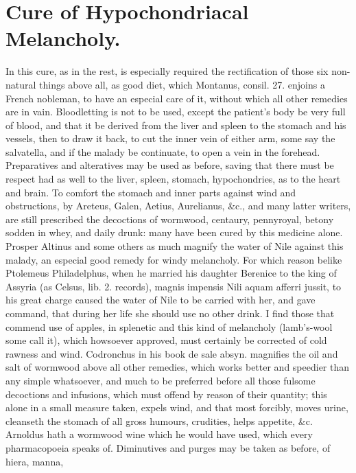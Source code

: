 \section{Cure of Hypochondriacal Melancholy.}

In this cure, as in the rest, is especially required the rectification
of those six non-natural things above all, as good diet, which
Montanus, consil. 27. enjoins a French nobleman, to have an especial
care of it, without which all other remedies are in vain. Bloodletting
is not to be used, except the patient's body be very full of blood, and
that it be derived from the liver and spleen to the stomach and his
vessels, then to draw it back, to cut the inner vein of either
arm, some say the salvatella, and if the malady be continuate, to
open a vein in the forehead.
Preparatives and alteratives may be used as before, saving that there
must be respect had as well to the liver, spleen, stomach,
hypochondries, as to the heart and brain. To comfort the stomach
and inner parts against wind and obstructions, by Areteus, Galen,
Aetius, Aurelianus, \&c., and many latter writers, are still prescribed
the decoctions of wormwood, centaury, pennyroyal, betony sodden in
whey, and daily drunk: many have been cured by this medicine alone.
Prosper Altinus and some others as much magnify the water of Nile
against this malady, an especial good remedy for windy melancholy. For
which reason belike Ptolemeus Philadelphus, when he married his
daughter Berenice to the king of Assyria (as Celsus, lib. 2. records),
magnis impensis Nili aquam afferri jussit, to his great charge caused
the water of Nile to be carried with her, and gave command, that during
her life she should use no other drink. I find those that commend use
of apples, in splenetic and this kind of melancholy (lamb's-wool some
call it), which howsoever approved, must certainly be corrected of cold
rawness and wind.
Codronchus in his book de sale absyn. magnifies the oil and salt of
wormwood above all other remedies, which works better and
speedier than any simple whatsoever, and much to be preferred before
all those fulsome decoctions and infusions, which must offend by reason
of their quantity; this alone in a small measure taken, expels wind,
and that most forcibly, moves urine, cleanseth the stomach of all gross
humours, crudities, helps appetite, \&c. Arnoldus hath a wormwood wine
which he would have used, which every pharmacopoeia speaks of.
Diminutives and purges may be taken as before, of hiera, manna,
